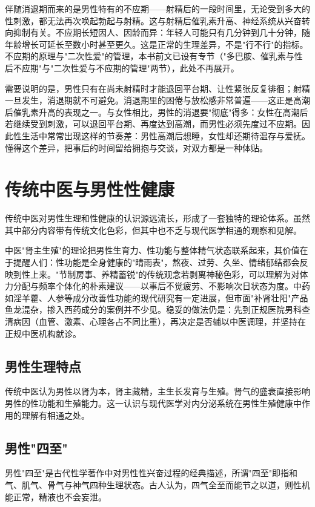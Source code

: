 伴随消退期而来的是男性特有的不应期——射精后的一段时间里，无论受到多大的性刺激，都无法再次唤起勃起与射精。这与射精后催乳素升高、神经系统从兴奋转向抑制有关。不应期长短因人、因龄而异：年轻人可能只有几分钟到几十分钟，随年龄增长可延长至数小时甚至更久。这是正常的生理差异，不是"行不行"的指标。不应期的原理与"二次性爱"的管理，本书前文已设有专节（"多巴胺、催乳素与性后不应期"与"二次性爱与不应期的管理"两节），此处不再展开。

需要说明的是，男性只有在尚未射精时才能退回平台期、让性紧张反复徘徊；射精一旦发生，消退期就不可避免。消退期里的困倦与放松感非常普遍——这正是高潮后催乳素升高的表现之一。与女性相比，男性的消退要"彻底"得多：女性在高潮后若继续受到刺激，可以退回平台期、再度达到高潮，而男性必须先度过不应期。因此性生活中常常出现这样的节奏差：男性高潮后想睡，女性却还期待温存与爱抚。懂得这个差异，把事后的时间留给拥抱与交谈，对双方都是一种体贴。

\section{传统中医与男性性健康}

传统中医对男性生理和性健康的认识源远流长，形成了一套独特的理论体系。虽然其中部分内容带有传统文化色彩，但其中也不乏与现代医学相通的观察和见解。


中医"肾主生殖"的理论把男性生育力、性功能与整体精气状态联系起来，其价值在于提醒人们：性功能是全身健康的"晴雨表"，熬夜、过劳、久坐、情绪郁结都会反映到性上来。"节制房事、养精蓄锐"的传统观念若剥离神秘色彩，可以理解为对体力分配与频率个体化的朴素建议——以事后不觉疲劳、不影响次日状态为度。中药如淫羊藿、人参等成分改善性功能的现代研究有一定进展，但市面"补肾壮阳"产品鱼龙混杂，掺入西药成分的案例并不少见。稳妥的做法仍是：先到正规医院男科查清病因（血管、激素、心理各占不同比重），再决定是否辅以中医调理，并坚持在正规中医机构就诊。

\subsection{男性生理特点}

传统中医认为男性以肾为本，肾主藏精，主生长发育与生殖。肾气的盛衰直接影响男性的性功能和生殖能力。这一认识与现代医学对内分泌系统在男性生殖健康中作用的理解有相通之处。

\subsection{男性"四至"}

男性"四至"是古代性学著作中对男性性兴奋过程的经典描述，所谓"四至"即指和气、肌气、骨气与神气四种生理状态。古人认为，四气全至而能节之以道，则性机能正常，精液也不会妄泄。

